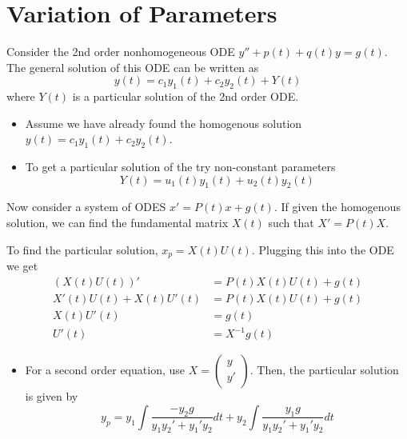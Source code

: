 \documentclass[a4paper, 10pt]{article}
\numberwithin{equation}{section}
\begin{document}
\section{Variation of Parameters}
Consider the 2nd order nonhomogeneous ODE $y''+p(t)+q(t)y=g(t)$. The general solution of this ODE can be written as 
\begin{equation}
    y(t)=c_1y_1(t)+c_2y_2(t)+Y(t)
\end{equation}
where $Y(t)$ is a particular solution of the 2nd order ODE.
\begin{itemize}
    \item Assume we have already found the homogenous solution $y(t)=c_1y_1(t)+c_2y_2(t)$.
    \item To get a particular solution of the try non-constant parameters
    \begin{equation}
        Y(t)=u_1(t)y_1(t)+u_2(t)y_2(t)
    \end{equation}    
\end{itemize}
Now consider a system of ODES $x'=P(t)x+g(t)$. If given the homogenous solution, we can find the fundamental matrix $X(t)$ such that $X'=P(t)X$.

To find the particular solution, $x_p=X(t)U(t)$. Plugging this into the ODE we get
\begin{align}
    (X(t)U(t))'&=P(t)X(t)U(t)+g(t)\\
    X'(t)U(t)+X(t)U'(t)&=P(t)X(t)U(t)+g(t)\\
    X(t)U'(t)&=g(t)\\
    U'(t)&=X^{-1}g(t)
\end{align}

\begin{itemize}
    \item For a second order equation, use $X=\begin{pmatrix}
        y\\y'
    \end{pmatrix}$. Then, the particular solution is given by\begin{equation}
        y_p=y_1\int\frac{-y_2g}{y_1y_2'+y_1'y_2}dt+y_2\int\frac{y_1g}{y_1y_2'+y_1'y_2}dt
    \end{equation}
\end{itemize}
\end{document}
